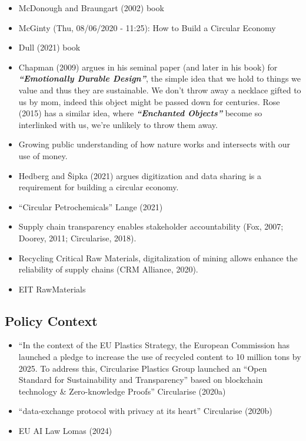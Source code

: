 \documentclass[
  letterpaper,
  DIV=11,
  numbers=noendperiod]{scrartcl}
\begin{document}
\begin{itemize}
\item
  McDonough and Braungart (2002) book
\item
  McGinty (Thu, 08/06/2020 - 11:25): How to Build a Circular Economy
\item
  Dull (2021) book
\item
  Chapman (2009) argues in his seminal paper (and later in his book) for
  \textbf{\emph{``Emotionally Durable Design''}}, the simple idea that
  we hold to things we value and thus they are sustainable. We don't
  throw away a necklace gifted to us by mom, indeed this object might be
  passed down for centuries. Rose (2015) has a similar idea, where
  \textbf{\emph{``Enchanted Objects''}} become so interlinked with us,
  we're unlikely to throw them away.
\item
  Growing public understanding of how nature works and intersects with
  our use of money.
\item
  Hedberg and Šipka (2021) argues digitization and data sharing is a
  requirement for building a circular economy.
\item
  ``Circular Petrochemicals'' Lange (2021)
\item
  Supply chain transparency enables stakeholder accountability (Fox,
  2007; Doorey, 2011; Circularise, 2018).
\item
  Recycling Critical Raw Materials, digitalization of mining allows
  enhance the reliability of supply chains (CRM Alliance, 2020).
\item
  EIT RawMaterials
\end{itemize}

\subsection{Policy Context}\label{policy-context}

\begin{itemize}
\item
  ``In the context of the EU Plastics Strategy, the European Commission
  has launched a pledge to increase the use of recycled content to 10
  million tons by 2025. To address this, Circularise Plastics Group
  launched an ``Open Standard for Sustainability and Transparency''
  based on blockchain technology \& Zero-knowledge Proofs'' Circularise
  (2020a)
\item
  ``data-exchange protocol with privacy at its heart'' Circularise
  (2020b)
\item
  EU AI Law Lomas (2024)
\end{itemize}
\end{document}
